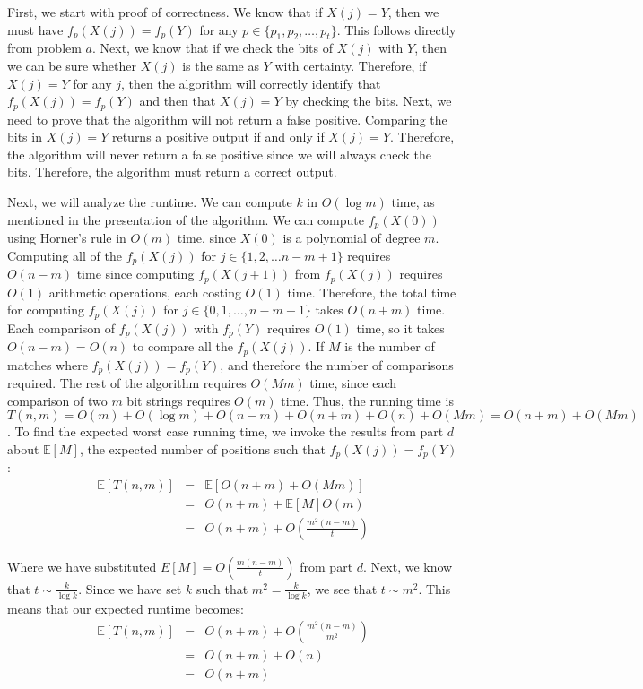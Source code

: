 \documentclass[psamsfonts]{amsart}
\newenvironment{sol}{{\bfseries Solution}}{\qedsymbol}
\theoremstyle{definition}
\theoremstyle{remark}
\numberwithin{equation}{section}
\begin{document}
\begin{sol}
First, we start with proof of correctness. We know that if $X(j) = Y$, then we must have $f_p(X(j)) = f_p(Y)$ for any $p \in \{p_1, p_2, \ldots, p_t \}$. This follows directly from problem $a$. Next, we know that if we check the bits of $X(j)$ with $Y$, then we can be sure whether $X(j)$ is the same as $Y$ with certainty. Therefore, if $X(j) = Y$ for any $j$, then the algorithm will correctly identify that $f_p(X(j)) = f_p(Y)$ and then that $X(j) = Y$ by checking the bits. Next, we need to prove that the algorithm will not return a false positive. Comparing the bits in $X(j) = Y$ returns a positive output if and only if $X(j) = Y$. Therefore, the algorithm will never return a false positive since we will always check the bits. Therefore, the algorithm must return a correct output.

Next, we will analyze the runtime. We can compute $k$ in $O(\log m)$ time, as mentioned in the presentation of the algorithm. We can compute $f_p(X(0))$ using Horner's rule in $O(m)$ time, since $X(0)$ is a polynomial of degree $m$. Computing all of the $f_p(X(j))$ for $j \in \{1, 2, \ldots n-m+1\}$ requires $O(n-m)$ time since computing $f_p(X(j+1))$ from $f_p(X(j))$ requires $O(1)$ arithmetic operations, each costing $O(1)$ time. Therefore, the total time for computing $f_p(X(j))$ for $j \in \{0,1,\ldots,n-m+1\}$ takes $O(n+m)$ time. Each comparison of $f_p(X(j))$ with $f_p(Y)$ requires $O(1)$ time, so it takes $O(n-m) = O(n)$ to compare all the $f_p(X(j))$. If $M$ is the number of matches where $f_p(X(j)) = f_p(Y)$, and therefore the number of comparisons required. The rest of the algorithm requires $O(Mm)$ time, since each comparison of two $m$ bit strings requires $O(m)$ time. Thus, the running time is $T(n,m) = O(m) + O(\log m) + O(n-m) + O(n+m) + O(n) + O(Mm) = O(n+m) + O(Mm)$. To find the expected worst case running time, we invoke the results from part $d$ about $\mathbb{E}[M]$, the expected number of positions such that $f_p(X(j)) = f_p(Y)$:
\begin{eqnarray}
\mathbb{E}[T(n,m)] &=& \mathbb{E}[O(n+m) + O(Mm)] \\
&=& O(n+ m) + \mathbb{E}[M] O(m) \\
&=& O(n+m) + O \left( \frac{m^2(n-m)}{t} \right) 
\end{eqnarray}

Where we have substituted $E[M] = O \left( \frac{m(n-m)}{t} \right)$ from part $d$. Next, we know that $t \sim \frac{k}{\log k}$. Since we have set $k$ such that $m^2 = \frac{k}{\log k}$, we see that $ t \sim m^2$. This means that our expected runtime becomes:
\begin{eqnarray}
\mathbb{E}[T(n,m)] &=& O(n+m) + O \left( \frac{m^2(n-m)}{m^2} \right) \\
&=& O(n+m) + O(n) \\
&=& O(n+m)
\end{eqnarray}


\end{sol}
\end{document}

